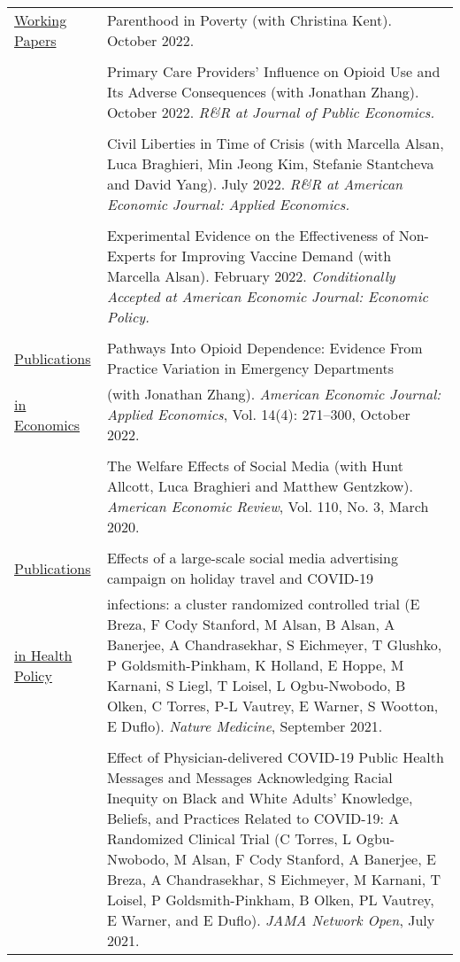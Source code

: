 \documentclass[letterpaper,11pt]{article}
\begin{document}
\begin{footnotesize}
{  \begin{tabularx}{\linewidth}{@{}
    >{\raggedright\arraybackslash\hsize=0.266\hsize}X 
    >{\raggedright\arraybackslash\hsize=1.733\hsize}X
  }
          \underline{Working Papers}  & Parenthood in Poverty (with Christina Kent). October 2022. \\
        & \\
& Primary Care Providers’ Influence on Opioid Use and Its Adverse Consequences (with Jonathan Zhang). October 2022. \textit{R\&R at Journal of Public Economics.}   \\
& \\
        & Civil Liberties in Time of Crisis (with Marcella Alsan, Luca Braghieri, Min Jeong Kim, Stefanie Stantcheva and David Yang). July 2022. \textit{R\&R at American Economic Journal: Applied Economics.} \\
& \\
& Experimental Evidence on the Effectiveness of Non-Experts for Improving Vaccine Demand (with Marcella Alsan). February 2022. \textit{Conditionally Accepted at American Economic Journal: Economic Policy.} \\
        & \\
        \underline{Publications}   & Pathways Into Opioid Dependence: Evidence From Practice Variation in Emergency Departments \\ 
        \underline{in Economics}  & (with Jonathan Zhang). \textit{American Economic Journal: Applied Economics}, Vol. 14(4): 271–300, October 2022.   \\
        &  \\
        & The Welfare Effects of Social Media (with Hunt Allcott, Luca Braghieri and Matthew Gentzkow). \textit{American Economic Review}, Vol. 110, No. 3, March 2020.  \\
        &  \\
 \underline{Publications}         & Effects of a large-scale social media advertising campaign on holiday travel and COVID-19 \\
 \underline{in Health Policy} &  infections: a cluster randomized controlled trial (E Breza, F Cody Stanford, M Alsan, B Alsan, A Banerjee, A Chandrasekhar, S Eichmeyer, T Glushko, P Goldsmith-Pinkham, K Holland, E Hoppe, M Karnani, S Liegl, T Loisel, L Ogbu-Nwobodo, B Olken, C Torres, P-L Vautrey, E Warner, S Wootton, E Duflo).  \textit{Nature Medicine}, September 2021.  \\
        &  \\
       & Effect of Physician-delivered COVID-19 Public Health Messages and Messages Acknowledging Racial Inequity on Black and White Adults' Knowledge, Beliefs, and Practices Related to COVID-19: A Randomized Clinical Trial (C Torres, L Ogbu-Nwobodo, M Alsan, F Cody Stanford, A Banerjee, E Breza, A Chandrasekhar, S Eichmeyer, M Karnani, T Loisel, P Goldsmith-Pinkham, B Olken, PL Vautrey, E Warner, and E Duflo).   \textit{JAMA Network Open}, July 2021.  \\

\end{tabularx}}
\end{footnotesize}
\end{document}
